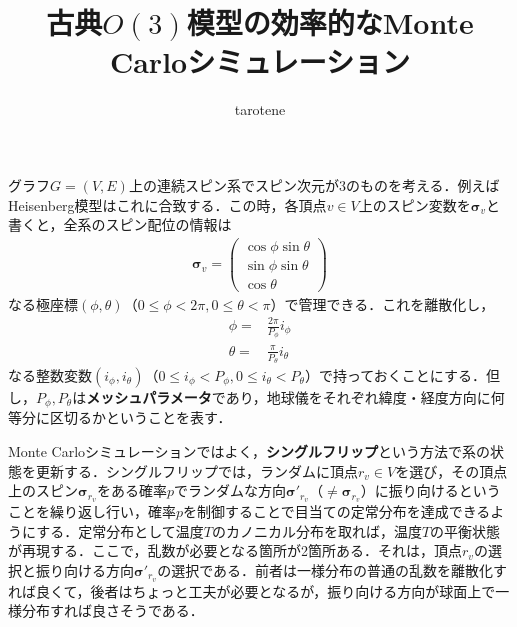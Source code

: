 \documentclass[a4,10pt, platex, dvipdfmx]{jsarticle}
\title{古典$ O\left(3\right) $模型の効率的なMonte Carloシミュレーション}
\author{tarotene}
\newcommand{\spin}{\bm{\sigma}}
\begin{document}
    \maketitle

    グラフ$ G = \left( V, E \right) $上の連続スピン系でスピン次元が$3$のものを考える．例えばHeisenberg模型はこれに合致する．この時，各頂点$ v \in V $上のスピン変数を$ \spin_{v} $と書くと，全系のスピン配位の情報は
    \begin{align}
        \spin_{v} =
        \begin{pmatrix}
            \cos \phi \sin \theta \\
            \sin \phi \sin \theta \\
            \cos \theta
        \end{pmatrix}\label{eq:polar-decardes}
    \end{align}
    なる極座標$\left(\phi, \theta\right)$（$0 \leq \phi < 2\pi, 0 \leq \theta < \pi$）で管理できる．これを離散化し，
    \begin{align}
        \phi = & \frac{2 \pi}{P_{\phi}} i_{\phi}\\
        \theta = & \frac{\pi}{P_{\theta}} i_{\theta}
    \end{align}
    なる整数変数$\left(i_{\phi}, i_{\theta}\right)$（$0 \leq i_{\phi} < P_{\phi}, 0 \leq i_{\theta} < P_{\theta}$）で持っておくことにする．但し，$ P_{\phi}, P_{\theta} $は\textbf{メッシュパラメータ}であり，地球儀をそれぞれ緯度・経度方向に何等分に区切るかということを表す．

    Monte Carloシミュレーションではよく，\textbf{シングルフリップ}という方法で系の状態を更新する．シングルフリップでは，ランダムに頂点$ r_{v} \in V $を選び，その頂点上のスピン$\spin_{r_{v}}$をある確率$ p $でランダムな方向$\spin'_{r_{v}}$（$\neq \spin_{r_{v}}$）に振り向けるということを繰り返し行い，確率$ p $を制御することで目当ての定常分布を達成できるようにする．定常分布として温度$T$のカノニカル分布を取れば，温度$T$の平衡状態が再現する．ここで，乱数が必要となる箇所が2箇所ある．それは，頂点$ r_{v} $の選択と振り向ける方向$\spin'_{r_{v}}$の選択である．前者は一様分布の普通の乱数を離散化すれば良くて，後者はちょっと工夫が必要となるが，振り向ける方向が球面上で一様分布すれば良さそうである．
\end{document}
